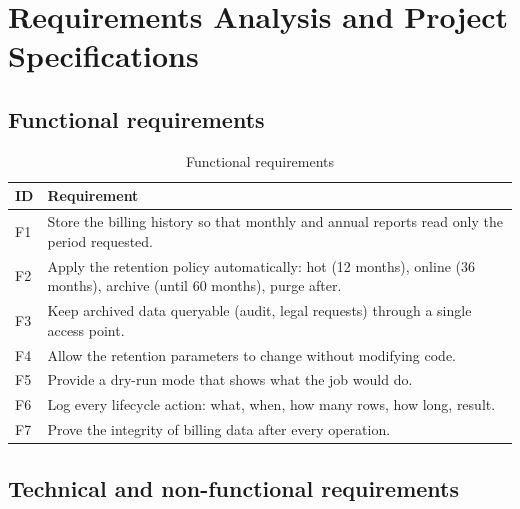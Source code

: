 \chapter{Requirements Analysis and Project Specifications}\label{ch:requirements}

\section{Functional requirements}

\begin{table}[H]
\centering
\caption{Functional requirements}
\begin{tabularx}{\linewidth}{lL}
\toprule
ID & Requirement \\
\midrule
F1 & Store the billing history so that monthly and annual reports read only the period requested. \\
F2 & Apply the retention policy automatically: hot (12 months), online (36 months), archive (until 60 months), purge after. \\
F3 & Keep archived data queryable (audit, legal requests) through a single access point. \\
F4 & Allow the retention parameters to change without modifying code. \\
F5 & Provide a dry-run mode that shows what the job would do. \\
F6 & Log every lifecycle action: what, when, how many rows, how long, result. \\
F7 & Prove the integrity of billing data after every operation. \\
\bottomrule
\end{tabularx}
\end{table}

\section{Technical and non-functional requirements}

